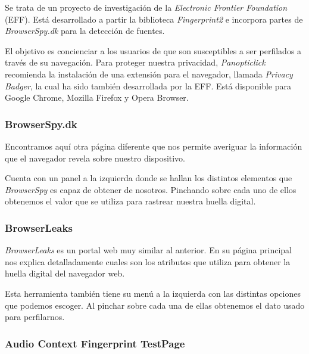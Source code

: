 Se trata de un proyecto de investigación de la \textit{Electronic Frontier Foundation} (EFF). Está desarrollado a partir la biblioteca \textit{Fingerprint2}\cite{fingerprintjs2} e incorpora partes de \textit{BrowserSpy.dk}\cite{browserSpy} para la detección de fuentes. \par 

El objetivo es concienciar a los usuarios de que son susceptibles a ser perfilados a través de su navegación. Para proteger nuestra privacidad, \textit{Panopticlick}\cite{panopticlick} recomienda la instalación de una extensión para el navegador, llamada \textit{Privacy Badger}, la cual ha sido también desarrollada por la EFF. Está disponible para Google Chrome, Mozilla Firefox y Opera Browser. \par 

\subsubsection{BrowserSpy.dk}

Encontramos aquí otra página diferente que nos permite averiguar la información que el navegador revela sobre nuestro dispositivo. \par 

Cuenta con un panel a la izquierda donde se hallan los distintos elementos que \textit{BrowserSpy}\cite{browserSpy} es capaz de obtener de nosotros. Pinchando sobre cada uno de ellos obtenemos el valor que se utiliza para rastrear nuestra huella digital. \par 

\subsubsection{BrowserLeaks}

\textit{BrowserLeaks}\cite{browserLeaks} es un portal web muy similar al anterior. En su página principal nos explica detalladamente cuales son los atributos que utiliza para obtener la huella digital del navegador web. \par 

Esta herramienta también tiene su menú a la izquierda con las distintas opciones que podemos escoger. Al pinchar sobre cada una de ellas obtenemos el dato usado para perfilarnos. \par 

\subsubsection{Audio Context Fingerprint TestPage}

